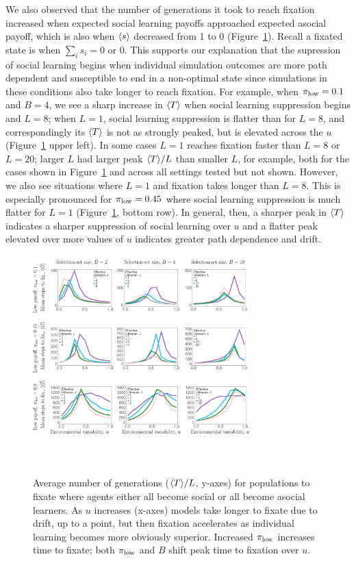 \documentclass[letterpaper,11.5pt]{scrartcl}
\begin{document}
We also observed that the number of generations it took to reach fixation increased
when expected social learning payoffs approached expected asocial payoff, which is also
when $\langle s \rangle$ decreased from 1 to 0 (Figure~\ref{fig:steps}). Recall a fixated
state is when $\sum_i s_i = 0 \text{ or } 0$.  This supports our explanation that
the supression of social learning begins when individual simulation outcomes are
more path dependent and susceptible to end in a non-optimal state since simulations
in these conditions also take longer to reach fixation.  For example, when
$\pi_{\mathrm{low}}=0.1$ and $B=4$, we see a sharp increase in $\langle T \rangle$ when social learning
suppression begins and $L=8$; when $L=1$, social learning suppression is flatter
than for $L=8$, and  correspondingly its $\langle T \rangle$ is not as strongly peaked, but is
elevated across the $u$ (Figure~\ref{fig:steps} upper left).  In some cases $L=1$
reaches fixation faster than $L=8$ or $L=20$; larger $L$ had larger peak $\langle T \rangle/L$
than smaller $L$, for example, both for the cases shown in Figure~\ref{fig:steps}
and across all settings tested but not shown. However, we also see situations where
$L=1$ and fixation takes longer than $L=8$.  This is especially pronounced for
$\pi_{\mathrm{low}} = 0.45$ where social learning suppression is much flatter for $L=1$
(Figure~\ref{fig:steps}, bottom row). In general, then, a sharper peak in $\langle T \rangle$
indicates a sharper suppression of social learning over $u$ and a flatter peak
elevated over more values of $u$ indicates greater path dependence and drift.


\begin{figure}
  \caption{Average number of generations ($\langle T \rangle/L$, y-axes) for populations to fixate
  where agents either all become social or all become asocial learners. As
  $u$ increases (x-axes) models take longer to fixate due to drift, up to a point,
but then fixation accelerates as individual learning becomes more obviously 
superior. Increased $\pi_{\mathrm{low}}$ increases time to fixate; both $\pi_{\mathrm{low}}$ and $B$
shift peak time to fixation over $u$.} 
  \label{fig:steps}
\centering
    \includegraphics[width=0.75\textwidth]{Figures/stepResultsPlots.pdf}
\end{figure}
\end{document}
